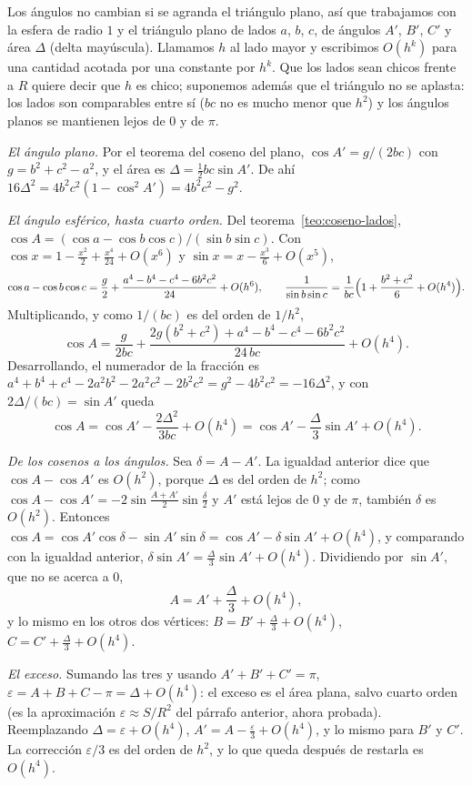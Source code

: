 \begin{demostracion}
Los ángulos no cambian si se agranda el triángulo plano, así que trabajamos con la esfera de
radio \(1\) y el triángulo plano de lados \(a\), \(b\), \(c\), de ángulos \(A'\), \(B'\), \(C'\)
y área \(\Delta\) (delta mayúscula). Llamamos \(h\) al lado mayor y escribimos \(O(h^k)\) para
una cantidad acotada por una constante por \(h^k\). Que los lados sean chicos frente a \(R\)
quiere decir que \(h\) es chico; suponemos además que el triángulo no se aplasta: los lados son
comparables entre sí (\(bc\) no es mucho menor que \(h^2\)) y los ángulos planos se mantienen
lejos de \(0\) y de \(\pi\).

\emph{El ángulo plano.} Por el teorema del coseno del plano, \(\cos A'=g/(2bc)\) con
\(g=b^2+c^2-a^2\), y el área es \(\Delta=\tfrac12bc\sin A'\). De ahí
\(16\Delta^2=4b^2c^2(1-\cos^2A')=4b^2c^2-g^2\).

\emph{El ángulo esférico, hasta cuarto orden.} Del teorema~\ref{teo:coseno-lados},
\(\cos A=(\cos a-\cos b\cos c)/(\sin b\sin c)\). Con
\(\cos x=1-\frac{x^2}2+\frac{x^4}{24}+O(x^6)\) y \(\sin x=x-\frac{x^3}6+O(x^5)\),
\[
\cos a-\cos b\cos c=\frac g2+\frac{a^4-b^4-c^4-6b^2c^2}{24}+O(h^6),\qquad
\frac1{\sin b\sin c}=\frac1{bc}\Bigl(1+\frac{b^2+c^2}6+O(h^4)\Bigr).
\]
Multiplicando, y como \(1/(bc)\) es del orden de \(1/h^2\),
\[
\cos A=\frac g{2bc}+\frac{2g(b^2+c^2)+a^4-b^4-c^4-6b^2c^2}{24\,bc}+O(h^4).
\]
Desarrollando, el numerador de la fracción es \(a^4+b^4+c^4-2a^2b^2-2a^2c^2-2b^2c^2=g^2-4b^2c^2=-16\Delta^2\),
y con \(2\Delta/(bc)=\sin A'\) queda
\[
\cos A=\cos A'-\frac{2\Delta^2}{3bc}+O(h^4)=\cos A'-\frac\Delta3\sin A'+O(h^4).
\]

\emph{De los cosenos a los ángulos.} Sea \(\delta=A-A'\). La igualdad anterior dice que
\(\cos A-\cos A'\) es \(O(h^2)\), porque \(\Delta\) es del orden de \(h^2\); como
\(\cos A-\cos A'=-2\sin\frac{A+A'}2\sin\frac\delta2\) y \(A'\) está lejos de \(0\) y de
\(\pi\), también \(\delta\) es \(O(h^2)\). Entonces
\(\cos A=\cos A'\cos\delta-\sin A'\sin\delta=\cos A'-\delta\sin A'+O(h^4)\), y comparando con
la igualdad anterior, \(\delta\sin A'=\frac\Delta3\sin A'+O(h^4)\). Dividiendo por
\(\sin A'\), que no se acerca a \(0\),
\[
A=A'+\frac\Delta3+O(h^4),
\]
y lo mismo en los otros dos vértices: \(B=B'+\frac\Delta3+O(h^4)\), \(C=C'+\frac\Delta3+O(h^4)\).

\emph{El exceso.} Sumando las tres y usando \(A'+B'+C'=\pi\),
\(\varepsilon=A+B+C-\pi=\Delta+O(h^4)\): el exceso es el área plana, salvo cuarto orden
(es la aproximación \(\varepsilon\approx S/R^2\) del párrafo anterior, ahora probada).
Reemplazando \(\Delta=\varepsilon+O(h^4)\),
\(A'=A-\frac\varepsilon3+O(h^4)\), y lo mismo para \(B'\) y \(C'\). La corrección
\(\varepsilon/3\) es del orden de \(h^2\), y lo que queda después de restarla es
\(O(h^4)\).
\end{demostracion}

